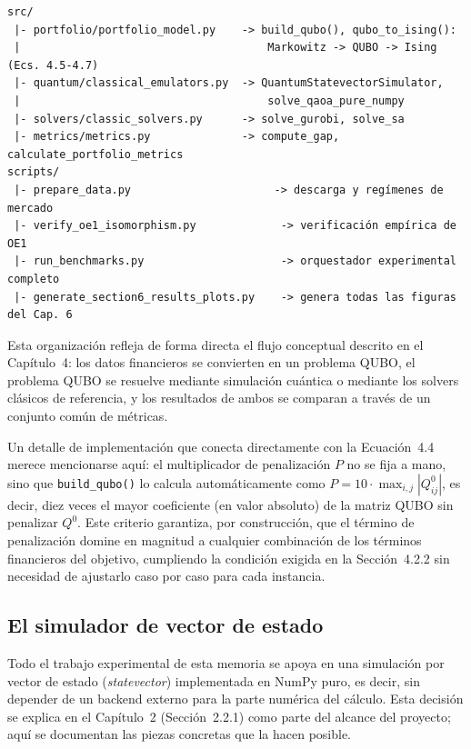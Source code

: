 \begin{verbatim}
src/
 |- portfolio/portfolio_model.py    -> build_qubo(), qubo_to_ising():
 |                                      Markowitz -> QUBO -> Ising (Ecs. 4.5-4.7)
 |- quantum/classical_emulators.py  -> QuantumStatevectorSimulator,
 |                                      solve_qaoa_pure_numpy
 |- solvers/classic_solvers.py      -> solve_gurobi, solve_sa
 |- metrics/metrics.py              -> compute_gap, calculate_portfolio_metrics
scripts/
 |- prepare_data.py                      -> descarga y regímenes de mercado
 |- verify_oe1_isomorphism.py             -> verificación empírica de OE1
 |- run_benchmarks.py                     -> orquestador experimental completo
 |- generate_section6_results_plots.py    -> genera todas las figuras del Cap. 6
\end{verbatim}

Esta organización refleja de forma directa el flujo conceptual descrito en el Capítulo~4: los datos financieros se convierten en un problema QUBO, el problema QUBO se resuelve mediante simulación cuántica o mediante los solvers clásicos de referencia, y los resultados de ambos se comparan a través de un conjunto común de métricas.

Un detalle de implementación que conecta directamente con la Ecuación~4.4 merece mencionarse aquí: el multiplicador de penalización $P$ no se fija a mano, sino que \texttt{build\_qubo()} lo calcula automáticamente como $P = 10 \cdot \max_{i,j} |Q^0_{ij}|$, es decir, diez veces el mayor coeficiente (en valor absoluto) de la matriz QUBO sin penalizar $Q^0$. Este criterio garantiza, por construcción, que el término de penalización domine en magnitud a cualquier combinación de los términos financieros del objetivo, cumpliendo la condición exigida en la Sección~4.2.2 sin necesidad de ajustarlo caso por caso para cada instancia.

\subsection{El simulador de vector de estado}

Todo el trabajo experimental de esta memoria se apoya en una simulación por vector de estado (\textit{statevector}) implementada en NumPy puro, es decir, sin depender de un backend externo para la parte numérica del cálculo. Esta decisión se explica en el Capítulo~2 (Sección~2.2.1) como parte del alcance del proyecto; aquí se documentan las piezas concretas que la hacen posible.

